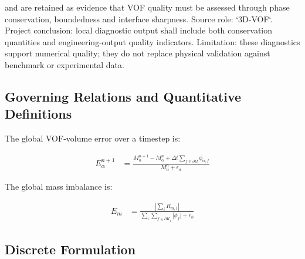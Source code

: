%

\textcite{roenby2016computational} and \textcite{vukcevic2018sharp}
are retained as evidence that VOF quality must be assessed through
phase conservation, boundedness and interface sharpness. Source role:
`3D-VOF`. Project conclusion: local diagnostic output shall include
both conservation quantities and engineering-output quality indicators.
Limitation: these diagnostics support numerical quality; they do not
replace physical validation against benchmark or experimental data.

\subsection{Governing Relations and Quantitative Definitions}
\label{sec:res-num-err-governing-relations}

%

The global VOF-volume error over a timestep is:

\begin{align}
  E_{\alpha}^{n+1}
  &=
  \frac{
    M_{\alpha}^{n+1}
    -
    M_{\alpha}^{n}
    +
    \Delta t
    \sum_{f\in\partial\Omega}
    \phi_{\alpha,f}
  }{
    M_{\alpha}^{n}
    +
    \epsilon_{\alpha}
  }
  \label{eq:res-num-err-local-alpha-volume-error}
\end{align}

The global mass imbalance is:

\begin{align}
  E_m
  &=
  \frac{
    \left|
      \sum_i
      R_{m,i}
    \right|
  }{
    \sum_i
    \sum_{f\in\partial K_i}
    \left|
      \phi_f
    \right|
    +
    \epsilon_{\phi}
  }
  \label{eq:res-num-err-local-global-mass-imbalance}
\end{align}

\subsection{Discrete Formulation}
\label{sec:res-num-err-discrete-formulation}

